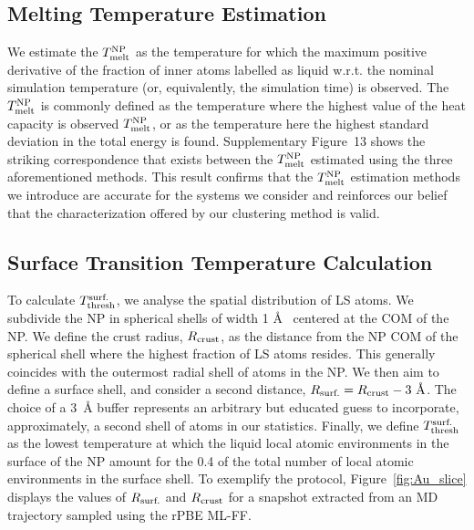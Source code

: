 \documentclass[%
aip,
 amsmath,amssymb,
 reprint,
]{revtex4-1}
\newcommand*\subt[1]{_{\textnormal{#1}}}
\newcommand*\supt[1]{^{\textnormal{#1}}}
\begin{document}
\subsection*{Melting Temperature Estimation}
\label{subsubsec:melting_t}
%
We estimate the $T\subt{melt}\supt{NP}$ as the temperature for which the maximum positive derivative of the fraction of inner atoms labelled as liquid w.r.t. the nominal simulation temperature (or, equivalently, the simulation time) is observed.
%
The $T\subt{melt}\supt{NP}$ is commonly defined as the temperature where the highest value of the heat capacity is observed $T\subt{melt}\supt{NP}$, or as the temperature here the highest standard deviation in the total energy is found. \cite{Delgado-Callico2020, chen2020heating, dai2017test}
%
Supplementary Figure~13 shows the striking correspondence that exists between the $T\subt{melt}\supt{NP}$ estimated using the three aforementioned methods.
%
This result confirms that the $T\subt{melt}\supt{NP}$ estimation methods we introduce are accurate for the systems we consider and reinforces our belief that the characterization offered by our clustering method is valid.
%

\subsection*{Surface Transition Temperature Calculation}
\label{subsubsec:surface_t}
%
To calculate $T\supt{surf.}\subt{thresh}$, we analyse the spatial distribution of LS atoms.
%
We subdivide the NP in spherical shells of width 1 \AA ~ centered at the COM of the NP.
%
We define the crust radius, $R\subt{crust}$, as the distance from the NP COM of the spherical shell where the highest fraction of LS atoms resides.
%
This generally coincides with the outermost radial shell of atoms in the NP.
%
We then aim to define a surface shell, and consider a second distance, $R\subt{surf.} = R\subt{crust} - 3~\text{\AA} $.
%
The choice of a 3~$\text{\AA}$ buffer represents an arbitrary but educated guess to incorporate, approximately, a second shell of atoms in our statistics.
%
Finally, we define $T\supt{surf.}\subt{thresh}$ as the lowest temperature at which the liquid local atomic environments in the surface of the NP amount for the 0.4 of the total number of local atomic environments in the surface shell.
%
To exemplify the protocol,  Figure~\ref{fig:Au_slice} displays the values of $R\subt{surf.}$ and $R\subt{crust}$ for a snapshot extracted from an MD trajectory sampled using the rPBE ML-FF.
\end{document}
